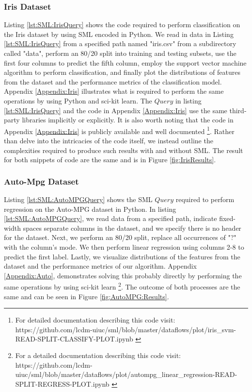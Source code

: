 \subsubsection{Iris Dataset}
Listing \ref{lst:SML:IrisQuery} shows the code required to perform classification on the Iris dataset by using SML encoded in Python.  We read in data in Listing \ref{lst:SML:IrisQuery} from a specified path named "iris.csv" from a subdirectory called "data", perform an 80/20 split into training and testing subsets, use the first four columns to predict the fifth column, employ the support vector machine algorithm to perform classification, and finally plot the distributions of features from the dataset and the performance metrics of the classification model.  Appendix \ref{Appendix:Iris} illustrates what is required to perform the same operations by using Python and sci-kit learn.  The \(Query\) in listing \ref{lst:SML:IrisQuery} and the code in Appendix \ref{Appendix:Iris} use the same third-party libraries implicitly or explicitly.  It is also worth noting that the code in Appendix \ref{Appendix:Iris} is publicly available and well documented \footnote{For detailed documentation describing this code visit: https://github.com/lcdm-uiuc/sml/blob/master/dataflows/plot/iris\_svm-READ-SPLIT-CLASSIFY-PLOT.ipynb \label{lab:iris:git}}.  Rather than delve into the intricacies of the code itself, we instead outline the complexities required to produce such results with and without SML.  The result for both snippets of code are the same and is in Figure \ref{fig:IrisResults}.

\subsubsection{Auto-Mpg Dataset}
Listing  \ref{lst:SML:AutoMPGQuery} shows the SML \(Query\) required to perform regression on the Auto-MPG dataset in Python.  In listing \ref{lst:SML:AutoMPGQuery}, we read data from a specified path, indicate fixed-width spaces separate columns in the dataset, and we specify there is no header for the dataset.  Next, we perform an 80/20 split, replace all occurrences of "?" with the column's mode. We then perform linear regression using columns 2-8 to predict the first label. Lastly, we visualize distributions of the features from the dataset and the performance metrics of our algorithm.  Appendix \ref{Appendix:Auto},  demonstrates solving this probably directly by performing the same  operations by using sci-kit learn \footnote{For a detailed documentation describing this code visit: https://github.com/lcdm-uiuc/sml/blob/master/dataflows/plot/autompg\_linear\_regression-READ-SPLIT-REGRESS-PLOT.ipynb \label{lab:SML:AUTO}}. The outcome of both processes are the same and can be seen in Figure \ref{fig:AutoMPG:Results}.

